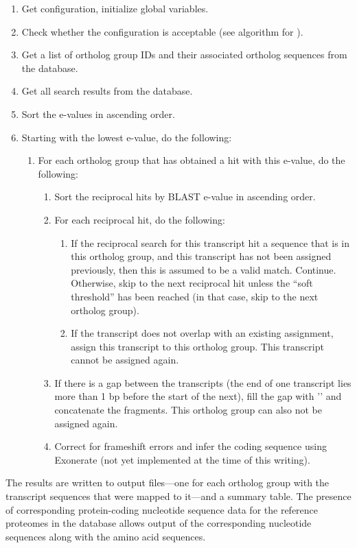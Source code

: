 \begin{enumerate}
	\item Get configuration, initialize global variables.
	\item Check whether the configuration is acceptable (see algorithm for
		).
	\item Get a list of ortholog group IDs and their associated ortholog sequences
		from the database.
	\item Get all search results from the database.
	\item Sort the  e-values in ascending order.
	\item Starting with the lowest  e-value, do the following:
	\begin{enumerate}
		\item For each ortholog group that has obtained a  hit with this
			e-value, do the following:
			\begin{enumerate}
				\item Sort the reciprocal hits by BLAST e-value in ascending order.
				\item For each reciprocal hit, do the following:
				\begin{enumerate}
					\item If the reciprocal search for this transcript hit a sequence that
						is in this ortholog group, and this transcript has not been assigned
						previously, then this is assumed to be a valid match. Continue.
						Otherwise, skip to the next reciprocal hit unless the ``soft
						threshold'' has been reached (in that case, skip to the next
						ortholog group).
					\item If the transcript does not overlap with an existing assignment,
						assign this transcript to this ortholog group. This transcript cannot
						be assigned again. 
				\end{enumerate}
			\item If there is a gap between the transcripts (the end of one transcript
				lies more than 1 bp before the start of the next), fill the gap with
				'' and concatenate the fragments. This ortholog group can also not be
				assigned again.
			\item Correct for frameshift errors and infer the coding sequence using
				Exonerate (not yet implemented at the time of this writing).
		\end{enumerate}
	\end{enumerate}
\end{enumerate}

The results are written to output files---one for each ortholog group with the
transcript sequences that were mapped to it---and a summary table. The presence
of corresponding protein-coding nucleotide sequence data for the reference
proteomes in the database allows output of the corresponding nucleotide
sequences along with the amino acid sequences.



